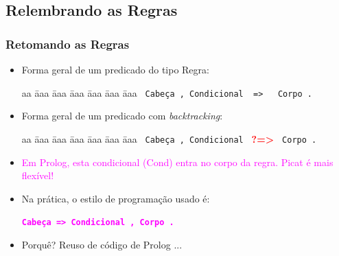 
\subsection{Relembrando as Regras}

\begin{frame} [fragile]

	\frametitle{Retomando as Regras}
    
    \begin{itemize}
        \item Forma geral de um predicado do tipo Regra:
    
        \begin{tabbing}
          aa \= aaa \= aaa \= aaa \= aaa \= aaa \= aaa \kill
          \> \> \verb+ Cabeça , Condicional  =>   Corpo .+ 
        \end{tabbing}

        \pause        
        \item  Forma geral de um predicado com \textit{backtracking}:
        
        \begin{tabbing}
          aa \= aaa \= aaa \= aaa \= aaa \= aaa \= aaa \kill
            \> \> \verb+ Cabeça , Condicional + \textbf{\textcolor{red}{?=>}} \verb+ Corpo .+
        \end{tabbing}

    \pause
    \item  \textcolor{magenta}{Em Prolog, esta condicional (Cond) entra no corpo da regra. Picat é mais flexível!}

    \pause
    \item Na prática,  o estilo de programação usado é:\\
    \begin{center}
        \textbf{ \textcolor{magenta}{ \texttt{Cabeça => Condicional , Corpo .} }}
    \end{center}

    \pause
    \item Porquê? Reuso de código de Prolog ...

    \end{itemize}

\end{frame}


